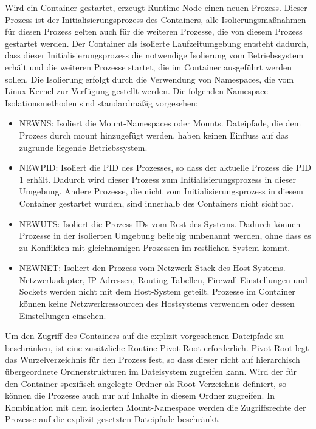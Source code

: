 Wird ein Container gestartet, erzeugt Runtime Node einen neuen Prozess. Dieser Prozess ist der Initialisierungsprozess des Containers, alle Isolierungsmaßnahmen für diesen Prozess gelten auch für die weiteren Prozesse, die von diesem Prozess gestartet werden. Der Container als isolierte Laufzeitumgebung entsteht dadurch, dass dieser Initialisierungsprozess die notwendige Isolierung vom Betriebssystem erhält und die weiteren Prozesse startet, die im Container ausgeführt werden sollen. Die Isolierung erfolgt durch die Verwendung von Namespaces, die vom Linux-Kernel zur Verfügung gestellt werden. Die folgenden Namespace-Isolationsmethoden sind standardmäßig vorgesehen:

\begin{itemize}
    \item NEWNS: Isoliert die Mount-Namespaces oder Mounts. Dateipfade, die dem Prozess durch mount hinzugefügt werden, haben keinen Einfluss auf das zugrunde liegende Betriebssystem.
    \item NEWPID: Isoliert die \gls{PID} des Prozesses, so dass der aktuelle Prozess die \gls{PID} 1 erhält. Dadurch wird dieser Prozess zum Initialisierungsprozess in dieser Umgebung. Andere Prozesse, die nicht vom Initialisierungsprozess in diesem Container gestartet wurden, sind innerhalb des Containers nicht sichtbar.
    \item NEWUTS: Isoliert die Prozess-IDs vom Rest des Systems. Dadurch können Prozesse in der isolierten Umgebung beliebig umbenannt werden, ohne dass es zu Konflikten mit gleichnamigen Prozessen im restlichen System kommt.
    \item NEWNET: Isoliert den Prozess vom Netzwerk-Stack des Host-Systems. Netzwerkadapter, IP-Adressen, Routing-Tabellen, Firewall-Einstellungen und Sockets werden nicht mit dem Host-System geteilt. Prozesse im Container können keine Netzwerkressourcen des Hostsystems verwenden oder dessen Einstellungen einsehen.
\end{itemize}

Um den Zugriff des Containers auf die explizit vorgesehenen Dateipfade zu beschränken, ist eine zusätzliche Routine Pivot Root erforderlich. Pivot Root legt das Wurzelverzeichnis für den Prozess fest, so dass dieser nicht auf hierarchisch übergeordnete Ordnerstrukturen im Dateisystem zugreifen kann. Wird der für den Container spezifisch angelegte Ordner als Root-Verzeichnis definiert, so können die Prozesse auch nur auf Inhalte in diesem Ordner zugreifen. In Kombination mit dem isolierten Mount-Namespace werden die Zugriffsrechte der Prozesse auf die explizit gesetzten Dateipfade beschränkt.

